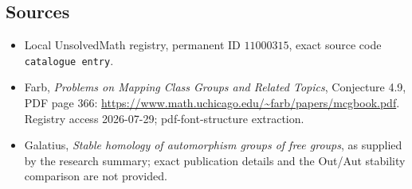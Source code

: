 \documentclass[11pt]{article}
\begin{document}
\subsection{Sources}
\begin{itemize}
\item Local UnsolvedMath registry, permanent ID \(11000315\), exact source code \texttt{catalogue entry}.
\item Farb, \emph{Problems on Mapping Class Groups and Related Topics}, Conjecture 4.9, PDF page 366: \url{https://www.math.uchicago.edu/~farb/papers/mcgbook.pdf}. Registry access 2026-07-29; pdf-font-structure extraction.
\item Galatius, \emph{Stable homology of automorphism groups of free groups}, as supplied by the research summary; exact publication details and the Out/Aut stability comparison are not provided.
\end{itemize}
\end{document}
